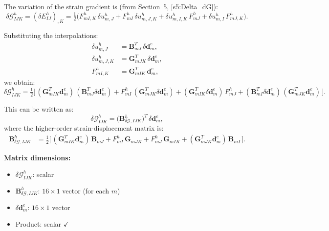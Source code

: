 \documentclass[11pt]{article}
\begin{document}
The variation of the strain gradient is (from Section~5, \eqref{s5:Delta_dG}):
\begin{equation}
\delta\mathcal{G}_{IJK}^{h}
= (\delta E_{IJ}^{h})_{,K}
= \tfrac12\bigl(F_{mI,K}^{h}\,\delta u_{m,J}^{h}
              + F_{mI}^{h}\,\delta u_{m,J,K}^{h}
              + \delta u_{m,I,K}^{h}\,F_{mJ}^{h}
              + \delta u_{m,I}^{h}\,F_{mJ,K}^{h}\bigr).
\end{equation}

Substituting the interpolations:
\begin{align}
\delta u_{m,J}^{h} &= \mathbf{B}_{mJ}^{T}\,\delta\mathbf{d}_{m}^{e},
\label{s6:delta_u_J}\\
\delta u_{m,J,K}^{h} &= \mathbf{G}_{mJK}^{T}\,\delta\mathbf{d}_{m}^{e},
\label{s6:delta_u_JK}\\
F_{mI,K}^{h} &= \mathbf{G}_{mIK}^{T}\,\mathbf{d}_{m}^{e},
\label{s6:F_mIK}
\end{align}
we obtain:
\begin{equation}
\delta\mathcal{G}_{IJK}^{h}
= \tfrac12\bigl[\,
   (\mathbf{G}_{mIK}^{T}\mathbf{d}_{m}^{e})\,(\mathbf{B}_{mJ}^{T}\delta\mathbf{d}_{m}^{e})
 + F_{mI}^{h}\,(\mathbf{G}_{mJK}^{T}\delta\mathbf{d}_{m}^{e})
 + (\mathbf{G}_{mIK}^{T}\delta\mathbf{d}_{m}^{e})\,F_{mJ}^{h}
 + (\mathbf{B}_{mI}^{T}\delta\mathbf{d}_{m}^{e})\,(\mathbf{G}_{mJK}^{T}\mathbf{d}_{m}^{e})
\,\bigr].
\label{s6:deltaG_h_raw}
\end{equation}

This can be written as:
\begin{equation}
\boxed{
\delta\mathcal{G}_{IJK}^{h}
= \bigl(\mathbf{B}_{\delta\mathcal{G},IJK}^{h}\bigr)^{T}\,\delta\mathbf{d}_{m}^{e},
}
\label{s6:deltaG_h}
\end{equation}
where the higher-order strain-displacement matrix is:
\begin{align}
\mathbf{B}_{\delta\mathcal{G},IJK}^{h}
&= \tfrac12\bigl[\,
   (\mathbf{G}_{mIK}^{T}\mathbf{d}_{m}^{e})\,\mathbf{B}_{mJ}
 + F_{mI}^{h}\,\mathbf{G}_{mJK}
 + F_{mJ}^{h}\,\mathbf{G}_{mIK}
 + (\mathbf{G}_{mJK}^{T}\mathbf{d}_{m}^{e})\,\mathbf{B}_{mI}
\,\bigr].
\label{s6:B_deltaG}
\end{align}

\textbf{Matrix dimensions:}
\begin{itemize}
\item $\delta\mathcal{G}_{IJK}^{h}$: scalar
\item $\mathbf{B}_{\delta\mathcal{G},IJK}^{h}$: $16\times 1$ vector (for each $m$)
\item $\delta\mathbf{d}_{m}^{e}$: $16\times 1$ vector
\item Product: scalar $\checkmark$
\end{itemize}
\end{document}
